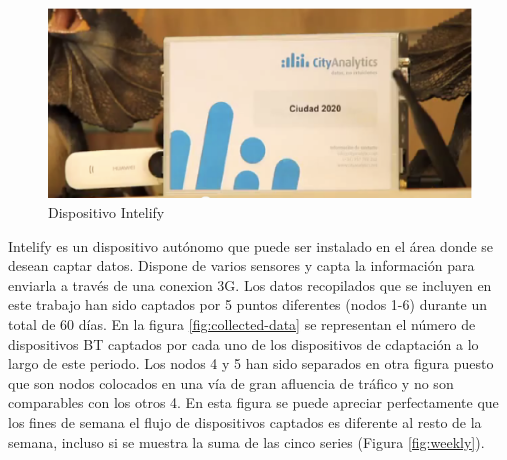 \documentclass[runningheads]{llncs}
\begin{document}
\begin{figure}[ht] 
\begin{center} 
\includegraphics[scale=0.6]{intelifychisme1.eps}
\end{center} 
\caption{Dispositivo Intelify} 
\label{intelify} 
\end{figure} 

Intelify es un dispositivo autónomo que puede ser instalado en el área donde se desean captar
datos. %
Dispone de varios sensores y capta la información para enviarla a través de una conexion 3G. 
Los datos recopilados que se incluyen en este trabajo han sido captados por 5 puntos diferentes
(nodos 1-6) durante un total de 60 días. En la figura \ref{fig:collected-data} se representan el
número de dispositivos BT captados por cada uno de los dispositivos de cdaptación a lo largo de este
periodo. Los nodos 4 y 5  han sido separados en otra figura puesto que son nodos colocados en una
vía de gran afluencia de tráfico y no son comparables con los otros 4. En esta figura se puede
apreciar perfectamente que los fines de semana el flujo de dispositivos captados es diferente al
resto de la
semana, incluso si se muestra la suma de las cinco series (Figura \ref{fig:weekly}).
\end{document}
